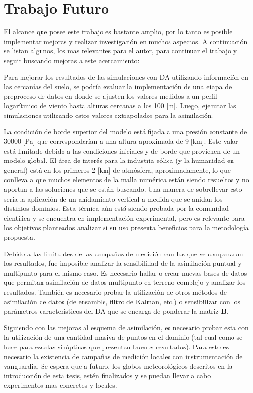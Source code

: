 \section{Trabajo Futuro}
El alcance que posee este trabajo es bastante amplio, por lo tanto es posible implementar mejoras y realizar investigación en muchos aspectos. A continuación se listan algunos, los mas relevantes para el autor, para continuar el trabajo y seguir buscando mejoras a este acercamiento:
\begin{itemize*}
	\item Para mejorar los resultados de las simulaciones con DA utilizando información en las cercanías del suelo, se podría evaluar la implementación de una etapa de preproceso de datos en donde se ajusten los valores medidos a un perfil logarítmico de viento hasta alturas cercanas a los 100 [m]. Luego, ejecutar las simulaciones utilizando estos valores extrapolados para la asimilación.
	\item La condición de borde superior del modelo está fijada a una presión constante de $30000$ [Pa] que corresponderían a una altura aproximada de 9 [km]. Este valor está limitado debido a las condiciones iniciales y de borde que provienen de un modelo global. El área de interés para la industria eólica (y la humanidad en general) está en los primeros 2 [km] de atmósfera, aproximadamente, lo que conlleva a que muchos elementos de la malla numérica están siendo resueltos y no aportan a las soluciones que se están buscando. Una manera de sobrellevar esto sería la aplicación de un anidamiento vertical a medida que se anidan los distintos dominios. Esta técnica aún está siendo probada por la comunidad científica y se encuentra en implementación experimental, pero es relevante para los objetivos planteados analizar si su uso presenta beneficios para la metodología propuesta.
	\item Debido a las limitantes de las campañas de medición con las que se compararon los resultados, fue imposible analizar la sensibilidad de la asimilación puntual y multipunto para el mismo caso. Es necesario hallar o crear nuevas bases de datos que permitan asimilación de datos multipunto en terreno complejo y analizar los resultados. También es necesario probar la utilización de otros métodos de asimilación de datos (de ensamble, filtro de Kalman, etc.) o sensibilizar con los parámetros característicos del DA que se encarga de ponderar la matriz $\textbf{B}$.
	\item Siguiendo con las mejoras al esquema de asimilación, es necesario probar esta con la utilización de una cantidad masiva de puntos en el dominio (tal cual como se hace para escalas sinópticas que presentan buenos resultados). Para esto es necesario la existencia de campañas de medición locales con instrumentación de vanguardia. Se espera que a futuro, los globos meteorológicos descritos en la introducción de esta tesis, estén finalizados y se puedan llevar a cabo experimentos mas concretos y locales.

\end{itemize*}
